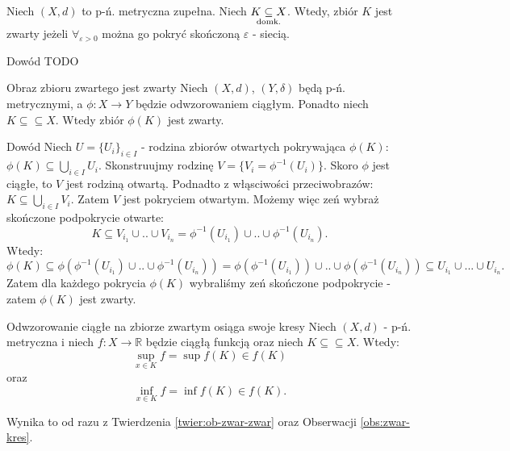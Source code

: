 \documentclass{article}
\numberwithin{defi}{section}
\numberwithin{defi}{section}
\newcommand{\R}{\mathbb{R}}
\newcommand{\subdomk}{\underset{\clap{\scriptsize domk.}}{\subseteq}}
\newcommand{\se}{\subseteq}
\providecommand{\eps}{\varepsilon}
\begin{document}
    \begin{twier}{}
        Niech $(X, d)$ to p-ń. metryczna zupełna. Niech $K \subdomk X$. Wtedy, zbiór $K$ jest zwarty jeżeli $\forall_{\eps >0}$ można go pokryć skończoną $\eps$ - siecią.
    \end{twier}
    \begin{dow}{Dowód}
        TODO
    \end{dow}


\begin{twier}[label=twier:ob-zwar-zwar]{Obraz zbioru zwartego jest zwarty}
    Niech $(X, d)$, $(Y, \delta)$ będą p-ń. metrycznymi, a $\phi: X \to Y$ będzie odwzorowaniem ciągłym. Ponadto niech $K \subseteq \subseteq X$. Wtedy zbiór $\phi(K)$ jest zwarty.
\end{twier}


\begin{dow}{Dowód}
    Niech $U = \{ U_i \}_{i \in I}$ - rodzina zbiorów otwartych pokrywająca $\phi(K)$: $\phi(K) \se \bigcup_{i \in I} U_i $. Skonstruujmy rodzinę $V = \{ V_i = \phi^{-1}(U_i) \}$. Skoro $\phi$ jest ciągłe, to $V$ jest rodziną otwartą. Podnadto z włąsciwości przeciwobrazów: $K \se \bigcup_{i \in I}V_i$. Zatem $V$ jest pokryciem otwartym. Możemy więc zeń wybraż skończone podpokrycie otwarte: \begin{equation*}
        K \se V_{i_1} \cup .. \cup V_{i_n} = \phi^{-1}(U_{i_1}) \cup .. \cup \phi^{-1}(U_{i_n}).
    \end{equation*} Wtedy: \begin{equation*}
        \phi(K) \se \phi(\phi^{-1}(U_{i_1}) \cup .. \cup \phi^{-1}(U_{i_n})) = \phi(\phi^{-1}(U_{i_1})) \cup .. \cup \phi(\phi^{-1}(U_{i_n})) \se U_{i_1} \cup ... \cup U_{i_n}.
    \end{equation*} Zatem dla każdego pokrycia $\phi(K)$ wybraliśmy zeń skończone podpokrycie - zatem $\phi(K)$ jest zwarty.
\end{dow}

\begin{obs}{Odwzorowanie ciągłe na zbiorze zwartym osiąga swoje kresy}
    Niech $(X, d)$ - p-ń. metryczna i niech $f: X \to \R$ będzie ciągłą funkcją oraz niech $K \se \se X$. Wtedy: \begin{equation}
        \sup_{x \in K} f = \sup f(K) \in f(K) 
    \end{equation} oraz\begin{equation}
        \inf_{x \in K} f = \inf f(K) \in f(K).
    \end{equation}
\end{obs}
    Wynika to od razu z Twierdzenia \ref{twier:ob-zwar-zwar} oraz Obserwacji \ref{obs:zwar-kres}.
    
\end{document}
